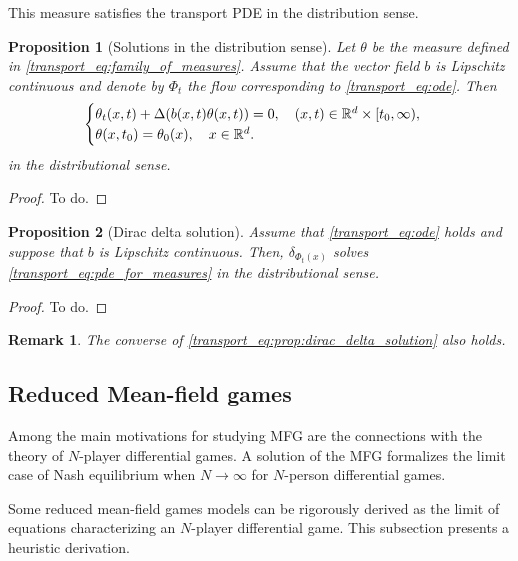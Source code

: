 \documentclass{article}
\newtheorem{proposition}{Proposition}
\newtheorem{remark}{Remark}
\begin{document}
This measure satisfies the transport PDE in the distribution sense. 
\begin{proposition}[Solutions in the distribution sense]
Let $\theta$ be the measure defined in \eqref{transport_eq:family_of_measures}. Assume that the vector field $b$ is Lipschitz continuous and denote by $\Phi_t$ the flow corresponding to \eqref{transport_eq:ode}. Then
\begin{equation}\label{transport_eq:pde_for_measures}
    \begin{cases}
        \theta_t(x,t) + \Delta(b(x,t) \theta(x,t)) = 0, \quad (x,t) \in \mathbb{R}^d \times [t_0,\infty),\\
        \theta(x,t_0) = \theta_0(x), \quad x\in \mathbb{R}^d.
    \end{cases}
\end{equation}
in the distributional sense.
\end{proposition}

\begin{proof}
    To do.
\end{proof}

\begin{proposition}[Dirac delta solution]\label{transport_eq:prop:dirac_delta_solution}
Assume that \eqref{transport_eq:ode} holds and suppose that $b$ is Lipschitz continuous. Then, $\delta_{\Phi_t(x)}$ solves \eqref{transport_eq:pde_for_measures} in the distributional sense.
\end{proposition}

\begin{proof}
    To do.
\end{proof}

\begin{remark} The converse of \eqref{transport_eq:prop:dirac_delta_solution} also holds.
\end{remark}

\subsection{Reduced Mean-field games}\label{reduced_mfg}
Among the main motivations for studying MFG are the connections with the theory of $N$-player differential games. A solution of the MFG formalizes the limit case of Nash equilibrium when $N \to \infty$ for $N$-person differential games.

Some reduced mean-field games models can be rigorously derived as the limit of equations characterizing an $N$-player differential game. This subsection presents a heuristic derivation.
\end{document}
